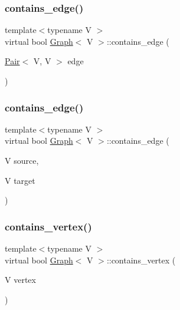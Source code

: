 \mbox{\label{classGraph_a9b5abbf0609d6759178231fd4ad1b9cf}} 
\subsubsection{\texorpdfstring{contains\+\_\+edge()}{contains\_edge()}\hspace{0.1cm}{\footnotesize\ttfamily [1/2]}}
{\footnotesize\ttfamily template$<$typename V $>$ \\
virtual bool \hyperlink{classGraph}{Graph}$<$ V $>$\+::contains\+\_\+edge (\begin{DoxyParamCaption}\item[{\hyperlink{classPair}{Pair}$<$ V, V $>$}]{edge }\end{DoxyParamCaption})\hspace{0.3cm}{\ttfamily [virtual]}}

\mbox{\label{classGraph_a8351227a94797412842af04eb5da11f1}} 
\subsubsection{\texorpdfstring{contains\+\_\+edge()}{contains\_edge()}\hspace{0.1cm}{\footnotesize\ttfamily [2/2]}}
{\footnotesize\ttfamily template$<$typename V $>$ \\
virtual bool \hyperlink{classGraph}{Graph}$<$ V $>$\+::contains\+\_\+edge (\begin{DoxyParamCaption}\item[{V}]{source,  }\item[{V}]{target }\end{DoxyParamCaption})\hspace{0.3cm}{\ttfamily [virtual]}}

\mbox{\label{classGraph_a7e92c541821a0d5631f06a1bf8e952b2}} 
\subsubsection{\texorpdfstring{contains\+\_\+vertex()}{contains\_vertex()}}
{\footnotesize\ttfamily template$<$typename V $>$ \\
virtual bool \hyperlink{classGraph}{Graph}$<$ V $>$\+::contains\+\_\+vertex (\begin{DoxyParamCaption}\item[{V}]{vertex }\end{DoxyParamCaption})\hspace{0.3cm}{\ttfamily [virtual]}}

